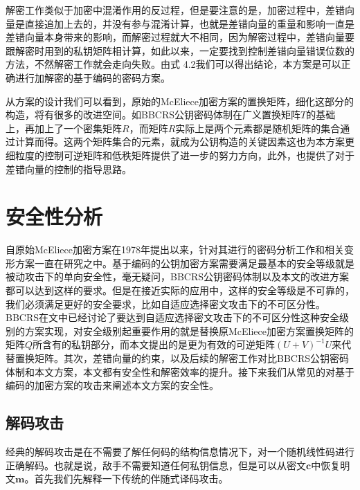 解密工作类似于加密中混淆作用的反过程，但是要注意的是，加密过程中，差错向量是直接追加上去的，并没有参与混淆计算，也就是差错向量的重量和影响一直是差错向量本身带来的影响，而解密过程就大不相同，因为解密过程中，差错向量要跟解密时用到的私钥矩阵相计算，如此以来，一定要找到控制差错向量错误位数的方法，不然解密工作就会走向失败。由式 4.2我们可以得出结论，本方案是可以正确进行加解密的基于编码的密码方案。

从方案的设计我们可以看到，原始的McEliece加密方案的置换矩阵，细化这部分的构造，将有很多的改进空间。如BBCRS公钥密码体制在广义置换矩阵$T$的基础上，再加上了一个密集矩阵$R$，而矩阵$R$实际上是两个元素都是随机矩阵的集合通过计算而得。这两个矩阵集合的元素，就成为公钥构造的关键因素这也为本方案更细粒度的控制可逆矩阵和低秩矩阵提供了进一步的努力方向，此外，也提供了对于差错向量的控制的指导思路。

\section{安全性分析}
自原始McEliece加密方案在1978年提出以来，针对其进行的密码分析工作和相关变形方案一直在研究之中。基于编码的公钥加密方案需要满足最基本的安全等级就是被动攻击下的单向安全性，毫无疑问，BBCRS公钥密码体制以及本文的改进方案都可以达到这样的要求。但是在接近实际的应用中，这样的安全等级是不可靠的，我们必须满足更好的安全要求，比如自适应选择密文攻击下的不可区分性。BBCRS在文中已经讨论了要达到自适应选择密文攻击下的不可区分性这种安全级别的方案实现，对安全级别起重要作用的就是替换原McEliece加密方案置换矩阵的矩阵$Q$所含有的私钥部分，而本文提出的是更为有效的可逆矩阵$(U + V) ^ {-1}U$来代替置换矩阵。其次，差错向量的约束，以及后续的解密工作对比BBCRS公钥密码体制和本文方案，本文都有安全性和解密效率的提升。接下来我们从常见的对基于编码的加密方案的攻击来阐述本文方案的安全性。

\subsection{解码攻击}
经典的解码攻击是在不需要了解任何码的结构信息情况下，对一个随机线性码进行正确解码。也就是说，敌手不需要知道任何私钥信息，但是可以从密文$\mathbf{c}$中恢复明文$\mathbf{m}$。首先我们先解释一下传统的伴随式译码攻击。

